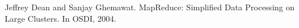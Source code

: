 \fontsize{10.5pt}{10.5pt}\selectfont
\begin{thebibliography}{10}

Jeffrey Dean and Sanjay Ghemawat.
\newblock MapReduce: Simplified Data Processing on Large Clusters.
\newblock In OSDI, 2004.



\end{thebibliography}
